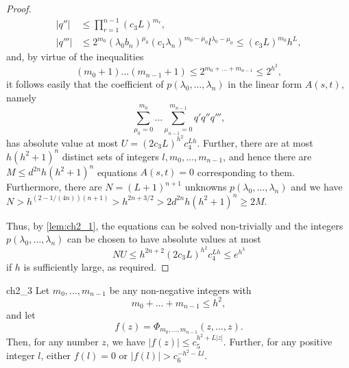 \begin{proof}
\begin{align*}
|q''| &\le \prod_{r=1}^{n-1} (c_3 L)^{m_r}, \\
|q'''| &\le 2^{m_0} (\lambda_0 b_n)^{\mu_0} (c_1 \lambda_n)^{m_0 - \mu_0} l^{\lambda_0 - \mu_0} \le (c_3 L)^{m_0} h^L,
\end{align*}
and, by virtue of the inequalities
\[
(m_0+1)\dots(m_{n-1}+1) \le 2^{m_0+\dots+m_{n-1}} \le 2^{h^2},
\]
it follows easily that the coefficient of $p(\lambda_0, \dots, \lambda_n)$ in the linear form $A(s,t)$, namely
\[
\sum_{\mu_0=0}^{m_0} \dots \sum_{\mu_{n-1}=0}^{m_{n-1}} q' q'' q''',
\]
has absolute value at most $U = (2c_3 L)^{h^2} c_4^{Lh}$. Further, there are at most $h(h^2+1)^n$ distinct sets of integers $l, m_0, \dots, m_{n-1}$, and hence there are $M \le d^{2n} h(h^2+1)^n$ equations $A(s,t)=0$ corresponding to them. Furthermore, there are $N=(L+1)^{n+1}$ unknowns $p(\lambda_0, \dots, \lambda_n)$ and we have $N > h^{(2-1/(4n))(n+1)} > h^{2n+3/2} > 2d^{2n} h(h^2+1)^n \ge 2M$.

Thus, by \autoref{lem:ch2_1}, the equations can be solved non-trivially and the integers $p(\lambda_0, \dots, \lambda_n)$ can be chosen to have absolute values at most
\[
NU \le h^{2n+2} (2c_3 L)^{h^2} c_4^{Lh} \le e^{h^3}
\]
if $h$ is sufficiently large, as required.
\end{proof}

\begin{mylemma}{}{ch2_3}
Let $m_0, \dots, m_{n-1}$ be any non-negative integers with
\[
m_0 + \dots + m_{n-1} \le h^2,
\]
and let
\begin{equation} \label{eq:ch2_7}\tag{7}
f(z) = \Phi_{m_0, \dots, m_{n-1}}(z, \dots, z).
\end{equation}
Then, for any number $z$, we have $|f(z)| \le c_5^{h^2+L|z|}$. Further, for any positive integer $l$, either $f(l) = 0$ or $|f(l)| > c_6^{-h^2-Ll}$.
\end{mylemma}

